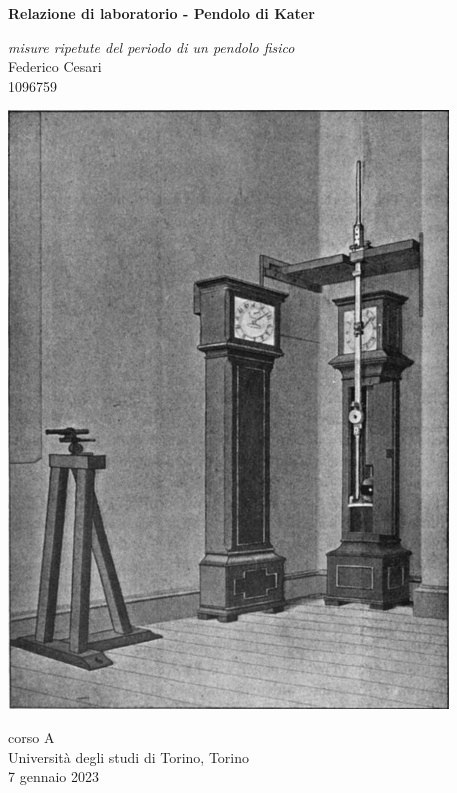 \begin{titlepage}
   \begin{center}
       \vspace*{1cm}
        
       \textbf{\LARGE Relazione di laboratorio - Pendolo di Kater}
       
       \vspace{0.3cm}
       \large \textit{misure ripetute del periodo di un pendolo fisico} \\
       
       \vspace{0.5cm}
       \Large Federico Cesari \\
       
       \small 1096759

			
		\vspace{1cm}
		\begin{center}
			\includegraphics[scale=0.4]{pendulum.png}
		\end{center}
		
		

       \vfill
            
       
            
       \vspace{0.8cm}
     
       
            
       corso A\\
       Università degli studi di Torino, Torino\\
       7 gennaio 2023\\
       
            
   \end{center}
\end{titlepage}
